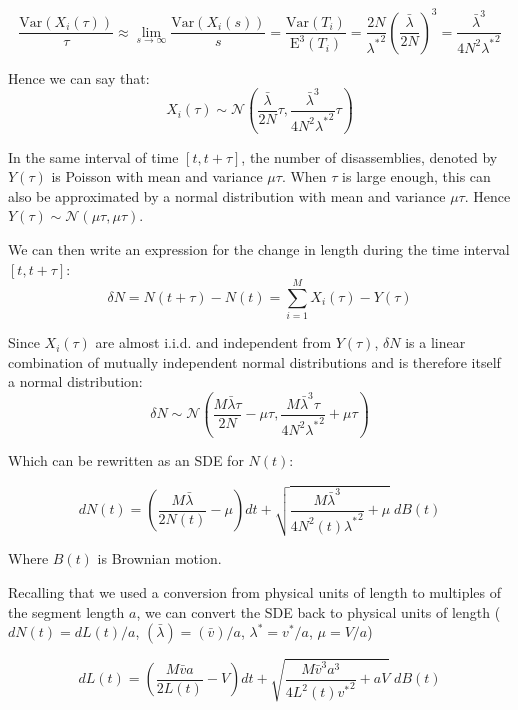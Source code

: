 \documentclass[titlepage]{article}
\newcommand{\var}{\textrm{Var}}
\newcommand{\E}{\textrm{E}}
\newcommand{\Normal}{\mathcal{N}}
\begin{document}
\begin{equation*}
\frac{\var(X_i(\tau))}{\tau}
\approx \lim_{s \to \infty}\frac{\var(X_i(s))}{s}
= \frac{\var(T_i)}{\E^3(T_i)}
= \frac{2N}{{\lambda^*}^2} \left(\frac{\bar{\lambda}}{2N}\right)^3
= \frac{\bar{\lambda}^3}{4N^2{\lambda^*}^2}
\end{equation*}

Hence we can say that:
\begin{equation*}
X_i(\tau) \sim \Normal\left( \frac{\bar{\lambda}}{2N}\tau, \frac{\bar{\lambda}^3}{4N^2{\lambda^*}^2}\tau \right)
\end{equation*}

In the same interval of time $[t, t+\tau]$, the number of disassemblies, denoted by $Y(\tau)$ is Poisson with mean and variance $\mu\tau$.
When $\tau$ is large enough, this can also be approximated by a normal distribution with mean and variance $\mu\tau$.
Hence $Y(\tau) \sim \Normal(\mu\tau,\mu\tau)$.

We can then write an expression for the change in length during the time interval $[t,t+\tau]$:
\begin{equation*}
\delta N = N(t+\tau) - N(t) = \sum_{i=1}^M{X_i(\tau)} - Y(\tau)
\end{equation*}

Since $X_i(\tau)$ are almost i.i.d. and independent from $Y(\tau)$, $\delta N$ is a linear combination of mutually independent normal distributions and is therefore itself a normal distribution:
\begin{equation*}
\delta N \sim \Normal\left( \frac{M\bar{\lambda}\tau}{2N} - \mu\tau, \frac{M\bar{\lambda}^3\tau}{4N^2{\lambda^*}^2} + \mu\tau \right)
\end{equation*}
 
Which can be rewritten as an SDE for $N(t)$:

\begin{equation*}
dN(t) = \left( \frac{M\bar{\lambda}}{2N(t)} - \mu \right)dt + \sqrt{ \frac{M \bar{\lambda}^3}{4N^2(t){\lambda^*}^2} + \mu } \phantom{.} dB(t)
\end{equation*}

Where $B(t)$ is Brownian motion.

Recalling that we used a conversion from physical units of length to multiples of the segment length $a$, we can convert the SDE back to physical units of length ($dN(t) = dL(t)/a$, $(\bar{\lambda}) = (\bar{v})/a$, $\lambda^* = v^*/a$, $\mu = V/a$)

\begin{equation*}
dL(t) = \left( \frac{M\bar{v}a}{2L(t)} - V \right)dt + \sqrt{ \frac{M \bar{v}^3a^3}{4L^2(t){v^*}^2} + aV } \phantom{.} dB(t)
\end{equation*}
\end{document}
